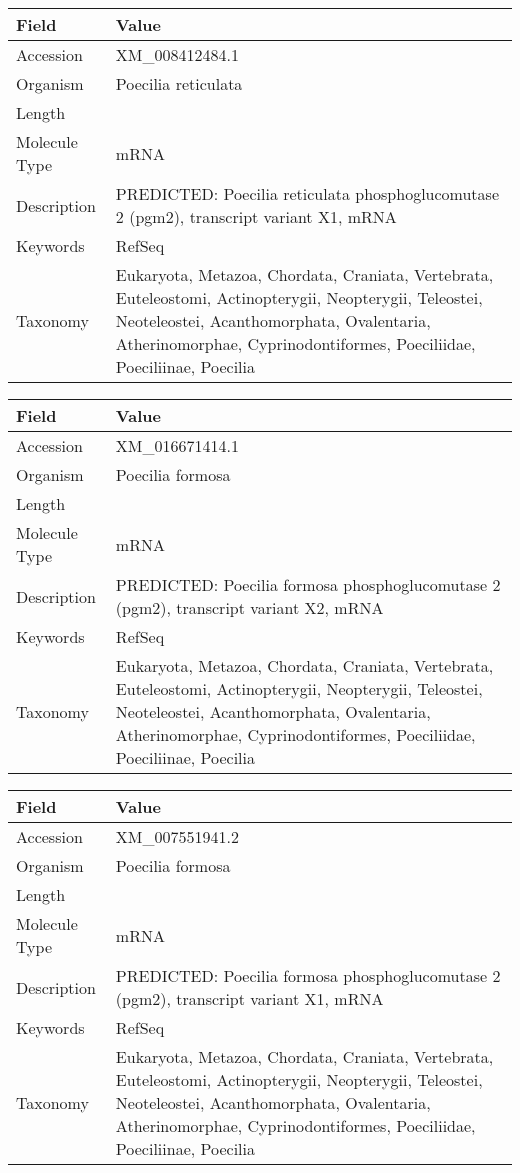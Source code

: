 \documentclass[10pt]{article}
\begin{document}
{\footnotesize
\begin{longtable}{>{\raggedright\arraybackslash}p{4.5cm} >{\raggedright\arraybackslash}p{11.5cm}}
\textbf{Field} & \textbf{Value} \\
\hline
Accession & XM\_008412484.1 \\
Organism & Poecilia reticulata \\
Length & 4154 \\
Molecule Type & mRNA \\
Description & PREDICTED: Poecilia reticulata phosphoglucomutase 2 (pgm2), transcript variant X1, mRNA \\
Keywords & RefSeq \\
Taxonomy & Eukaryota, Metazoa, Chordata, Craniata, Vertebrata, Euteleostomi, Actinopterygii, Neopterygii, Teleostei, Neoteleostei, Acanthomorphata, Ovalentaria, Atherinomorphae, Cyprinodontiformes, Poeciliidae, Poeciliinae, Poecilia \\
\end{longtable}
}

{\footnotesize
\begin{longtable}{>{\raggedright\arraybackslash}p{4.5cm} >{\raggedright\arraybackslash}p{11.5cm}}
\textbf{Field} & \textbf{Value} \\
\hline
Accession & XM\_016671414.1 \\
Organism & Poecilia formosa \\
Length & 3750 \\
Molecule Type & mRNA \\
Description & PREDICTED: Poecilia formosa phosphoglucomutase 2 (pgm2), transcript variant X2, mRNA \\
Keywords & RefSeq \\
Taxonomy & Eukaryota, Metazoa, Chordata, Craniata, Vertebrata, Euteleostomi, Actinopterygii, Neopterygii, Teleostei, Neoteleostei, Acanthomorphata, Ovalentaria, Atherinomorphae, Cyprinodontiformes, Poeciliidae, Poeciliinae, Poecilia \\
\end{longtable}
}

{\footnotesize
\begin{longtable}{>{\raggedright\arraybackslash}p{4.5cm} >{\raggedright\arraybackslash}p{11.5cm}}
\textbf{Field} & \textbf{Value} \\
\hline
Accession & XM\_007551941.2 \\
Organism & Poecilia formosa \\
Length & 4157 \\
Molecule Type & mRNA \\
Description & PREDICTED: Poecilia formosa phosphoglucomutase 2 (pgm2), transcript variant X1, mRNA \\
Keywords & RefSeq \\
Taxonomy & Eukaryota, Metazoa, Chordata, Craniata, Vertebrata, Euteleostomi, Actinopterygii, Neopterygii, Teleostei, Neoteleostei, Acanthomorphata, Ovalentaria, Atherinomorphae, Cyprinodontiformes, Poeciliidae, Poeciliinae, Poecilia \\
\end{longtable}
}
\end{document}

